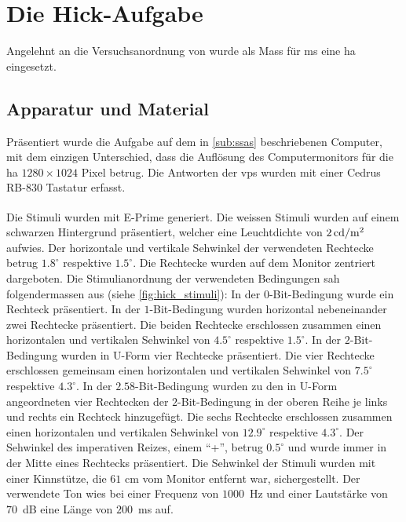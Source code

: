 \documentclass[11pt, twoside, a4paper]{book}		%
\begin{document}
\section{Die Hick-Aufgabe \label{sec:Hick}}

Angelehnt an die Versuchsanordnung von \citet{Rammsayer2007} wurde als Mass für \gls{ms} eine \gls{ha} eingesetzt.

\subsection{Apparatur und Material \label{sub:}}
Präsentiert wurde die Aufgabe auf dem in \autoref{sub:ssas} beschriebenen Computer, mit dem einzigen Unterschied, dass die Auflösung des Computermonitors für die \gls{ha} $1280 \times 1024$ Pixel betrug. Die Antworten der \glspl{vp} wurden mit einer Cedrus RB-830 Tastatur erfasst. 

Die Stimuli wurden mit E-Prime\textsuperscript{\textregistered} \citep{eprime} generiert. Die weissen Stimuli wurden auf einem schwarzen Hintergrund präsentiert, welcher eine Leuchtdichte von $2\,\textnormal{cd}/ \textnormal{m}^2$ aufwies. Der horizontale und vertikale Sehwinkel der verwendeten Rechtecke betrug $1.8^{\circ}$ respektive $1.5^{\circ}$. Die Rechtecke wurden auf dem Monitor zentriert dargeboten. Die Stimulianordnung der verwendeten Bedingungen sah folgendermassen aus (siehe \autoref{fig:hick_stimuli}):  In der $0$-Bit-Bedingung wurde ein Rechteck präsentiert. In der $1$-Bit-Bedingung wurden horizontal nebeneinander zwei Rechtecke präsentiert. Die beiden Rechtecke erschlossen zusammen einen horizontalen und vertikalen Sehwinkel von $4.5^{\circ}$ respektive $1.5^{\circ}$. In der $2$-Bit-Bedingung wurden in U-Form vier Rechtecke präsentiert. Die vier Rechtecke erschlossen gemeinsam einen horizontalen und vertikalen Sehwinkel von $7.5^{\circ}$ respektive $4.3^{\circ}$. In der $2.58$-Bit-Bedingung wurden zu den in U-Form angeordneten vier Rechtecken der $2$-Bit-Bedingung in der oberen Reihe je links und rechts ein Rechteck hinzugefügt. Die sechs Rechtecke erschlossen zusammen einen horizontalen und vertikalen Sehwinkel von $12.9^{\circ}$ respektive $4.3^{\circ}$. Der Sehwinkel des imperativen Reizes, einem \enquote{+}, betrug $0.5^{\circ}$ und wurde  immer in der Mitte eines Rechtecks präsentiert. Die Sehwinkel der Stimuli wurden mit einer Kinnstütze, die $61$ cm vom Monitor entfernt war, sichergestellt. Der verwendete Ton wies bei einer Frequenz von $1000$~Hz und einer Lautstärke von $70$~dB eine Länge von $200$~ms auf.
\end{document}
